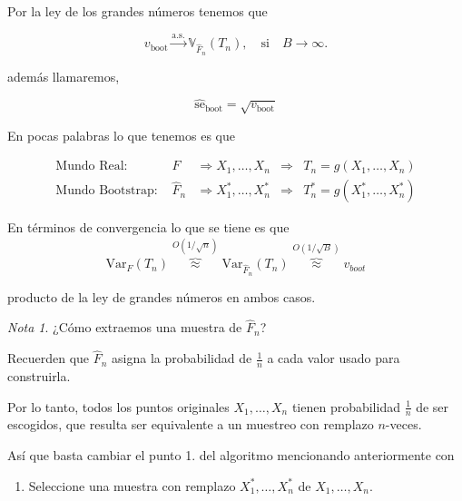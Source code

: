 \documentclass[
  12pt,
]{book}
\providecommand{\tightlist}{%
  \setlength{\itemsep}{0pt}\setlength{\parskip}{0pt}}
\theoremstyle{definition}
\theoremstyle{definition}
\theoremstyle{definition}
\theoremstyle{definition}
\theoremstyle{remark}
\newtheorem*{remark}{Nota}
\begin{document}
Por la ley de los grandes números tenemos que

\begin{equation}
v_{\mathrm{boot}} \stackrel{\mathrm{a.s.}}{\longrightarrow} \mathbb{V}_{\widehat{F}_{n}}\left(T_{n}\right), \quad  \text{si} \quad B\rightarrow \infty.
\end{equation}

además llamaremos,

\begin{equation*}
\widehat{\mathrm{se}}_{\mathrm{boot}}=\sqrt{v_{\mathrm{boot}}}
\end{equation*}

En pocas palabras lo que tenemos es que

\begin{align*}
\text  {Mundo Real: }
& F
& \Longrightarrow  X_{1}, \ldots, X_{n}
& \Longrightarrow
& T_{n} = g\left(X_{1}, \ldots, X_{n}\right) \\
\text {Mundo Bootstrap: }
& \widehat{F}_{n}
& \Longrightarrow  X_{1}^{*}, \ldots, X_{n}^{*}
& \Longrightarrow
& T_{n}^{*}=g\left(X_{1}^{*}, \ldots, X_{n}^{*}\right)
\end{align*}

En términos de convergencia lo que se tiene es que
\[
\mathrm{Var}_{F}\left(T_{n}\right) \overbrace{\approx}^{O(1 / \sqrt{n})} \mathrm{Var}_{\widehat{F}_{n}}\left(T_{n}\right) \overbrace{\approx}^{O(1 / \sqrt{B})} v_{b o o t}
\]

producto de la ley de grandes números en ambos casos.

\begin{remark}
¿Cómo extraemos una muestra de \(\hat{F}_n\)?
\end{remark}

Recuerden que \(\hat{F}_{n}\) asigna la probabilidad de \(\frac{1}{n}\) a cada valor usado para construirla.

Por lo tanto, todos los puntos originales \(X_{1},\ldots,X_{n}\) tienen probabilidad \(\frac{1}{n}\) de ser escogidos, que resulta ser equivalente a un muestreo con remplazo \(n\)-veces.

Así que basta cambiar el punto 1. del algoritmo mencionando anteriormente con

\begin{enumerate}
\def\labelenumi{\arabic{enumi}.}
\tightlist
\item
  Seleccione una muestra con remplazo \(X_{1}^{*}, \ldots, X_{n}^{*}\) de \(X_{1},\ldots,X_{n}\).
\end{enumerate}
\end{document}
